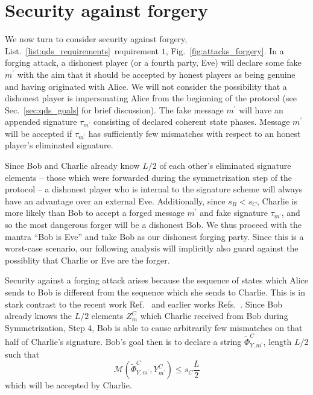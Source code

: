 \section{Security against forgery}\label{sec:qds_security_forgery}
We now turn to consider security against forgery, List.~\ref{list:qds_requirements}~requirement $1$, Fig.~\ref{fig:attacks_forgery}. In a forging attack, a dishonest player (or a fourth party, Eve) will declare some fake $m^\prime$ with the aim that it should be accepted by honest players as being genuine and having originated with Alice. %
We will not consider the possibility that a dishonest player is impersonating Alice from the beginning of the protocol (see Sec.~\ref{sec:qds_goals} for brief discussion). The fake message $m^\prime$ will have an appended signature $\tau_{m^\prime}$ consisting of declared coherent state phases. Message $m^\prime$ will be accepted if $\tau_{m^\prime}$ has sufficiently few mismatches with respect to an honest player's eliminated signature. 


Since Bob and Charlie already know $L/2$ of each other's eliminated signature elements -- those which were forwarded during the symmetrization step of the protocol -- a dishonest player who is internal to the signature scheme will always have an advantage over an external Eve. Additionally, since $s_B < s_C$, Charlie is more likely than Bob to accept a forged message $m^\prime$ and fake signature $\tau_{m^\prime}$, and so the most dangerous forger will be a dishonest Bob. We thus proceed with the mantra ``Bob is Eve'' and take Bob as our dishonest forging party. Since this is a worst-case scenario, our following analysis will implicitly also guard against the possiblity that Charlie or Eve are the forger.

Security against a forging attack arises because the sequence of states which Alice sends to Bob is different from the sequence which she sends to Charlie. This is in stark contrast to the recent work Ref.~\cite{Croal2016} and earlier works Refs.~\cite{Collins2014, Donaldson2016, Dunjko2014, Gottesman2001}. Since Bob already knows the $L/2$ elements $Z_{m}^C$ which Charlie received from Bob during Symmetrization, Step $4$, Bob is able to cause arbitrarily few mismatches on that half of Charlie's signature. Bob's goal then is to declare a string $\tilde{\Phi}^C_{Y, m^\prime}$, length $L/2$ such that 
\begin{equation}\label{eqn:forging_condition}
\mathcal{M}\left(\tilde{\Phi}^C_{Y, m^\prime}, Y_{m^\prime}^C\right) \le s_C \frac{L}{2}
\end{equation}
which will be accepted by Charlie.

